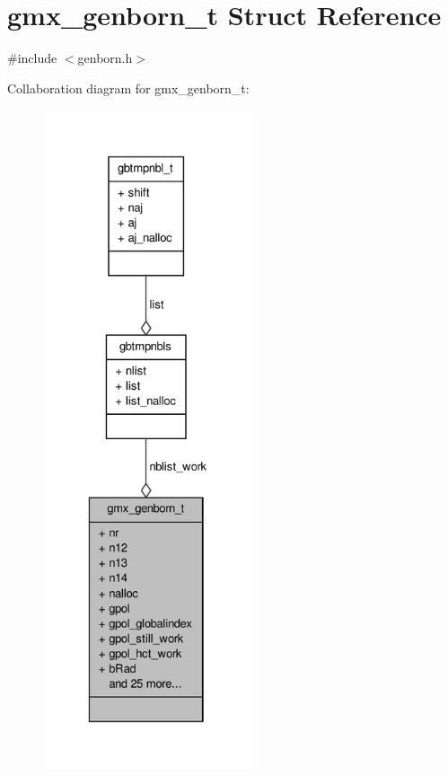 \hypertarget{structgmx__genborn__t}{\section{gmx\-\_\-genborn\-\_\-t \-Struct \-Reference}
\label{structgmx__genborn__t}
}


{\ttfamily \#include $<$genborn.\-h$>$}



\-Collaboration diagram for gmx\-\_\-genborn\-\_\-t\-:
\nopagebreak
\begin{figure}[H]
\begin{center}
\leavevmode
\includegraphics[height=550pt]{structgmx__genborn__t__coll__graph}
\end{center}
\end{figure}
